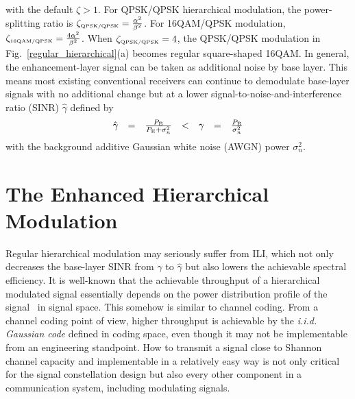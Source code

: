 \documentclass[conference]{IEEEtran}
\begin{document}
\noindent with the default $\zeta > 1$. For QPSK/QPSK hierarchical
modulation, the power-splitting ratio is $\zeta_{\mbox{\tiny
QPSK/QPSK}}= \frac{\alpha^{2}}{\beta^{2}}$. For 16QAM/QPSK
modulation, $\zeta_{\mbox{\tiny 16QAM/QPSK}}=
\frac{4\alpha^{2}}{\beta^{2}}$. When $\zeta_{\mbox{\tiny
QPSK/QPSK}}=4$, the QPSK/QPSK modulation in
Fig.~\ref{regular_hierarchical}(a) becomes regular square-shaped
16QAM. In general, the enhancement-layer signal can be taken as
additional noise by base layer. This means most existing
conventional receivers can continue to demodulate base-layer
signals with no additional change but at a lower
signal-to-noise-and-interference ratio (SINR) $\hat{\gamma}$
defined by
\begin{equation}
\begin{array}{rcccccl}
\hat{\gamma}& = & \frac{P_{\mbox{\tiny B}}}{P_{\mbox{\tiny
E}}+\sigma_{n}^{2}}&<&\gamma&=&\frac{P_{\mbox{\tiny
B}}}{\sigma_{n}^{2}}
\end{array}\label{SINR}
\end{equation}
\noindent with the background additive Gaussian white noise (AWGN)
power $\sigma_{n}^{2}$.

\section{The Enhanced Hierarchical Modulation}
Regular hierarchical modulation may seriously suffer from ILI,
which not only decreases the base-layer SINR from ${\gamma}$ to
$\hat{\gamma}$ but also lowers the achievable spectral efficiency.
It is well-known that the achievable throughput of a hierarchical
modulated signal essentially depends on the power distribution
profile of the signal~\cite{Unge82} in signal space. This somehow
is similar to channel coding. From a channel coding point of view,
higher throughput is achievable by the {\em i.i.d. Gaussian code}
defined in coding space, even though it may not be implementable
from an engineering standpoint. How to transmit a signal close to
Shannon channel capacity and implementable in a relatively easy
way is not only critical for the signal constellation design but
also every other component in a communication system, including
modulating signals.
\end{document}
